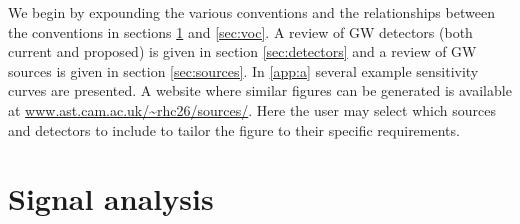 We begin by expounding the various conventions and the relationships between the conventions in sections \ref{sec:conventions} and \ref{sec:voc}. A review of GW detectors (both current and proposed) is given in section \ref{sec:detectors} and a review of GW sources is given in section \ref{sec:sources}. In \ref{app:a} several example sensitivity curves are presented. A website where similar figures can be generated is available at \url{www.ast.cam.ac.uk/~rhc26/sources/}. Here the user may select which sources and detectors to include to tailor the figure to their specific requirements.


\section{Signal analysis}\label{sec:conventions}

